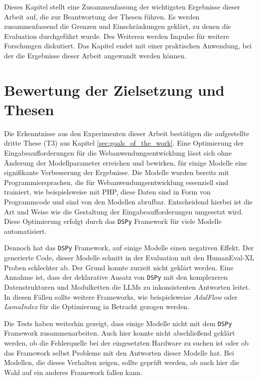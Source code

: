 Dieses Kapitel stellt eine Zusammenfassung der wichtigsten Ergebnisse dieser Arbeit auf, die zur Beantwortung der Thesen führen. Es werden zusammenfassend die Grenzen und Einschränkungen geklärt, zu denen die Evaluation durchgeführt wurde. Des Weiteren werden Impulse für weitere Forschungen diskutiert. Das Kapitel endet mit einer praktischen Anwendung, bei der die Ergebnisse dieser Arbeit angewandt werden können.


\section{Bewertung der Zielsetzung und Thesen}
Die Erkenntnisse aus den Experimenten dieser Arbeit bestätigen die aufgestellte dritte These (T3) aus Kapitel \ref{sec:goals_of_the_work}. Eine Optimierung der Eingabeaufforderungen für die Webanwendungsentwicklung lässt sich ohne Änderung der Modellparameter erreichen und bewirken, für einige Modelle eine signifikante Verbesserung der Ergebnisse. Die Modelle wurden bereits mit Programmiersprachen, die für Webanwendungsentwicklung essenziell sind trainiert, wie beispielsweise mit PHP, diese Daten sind in Form von Programmcode und sind von den Modellen abrufbar. Entscheidend hierbei ist die Art und Weise wie die Gestaltung der Eingabeaufforderungen umgesetzt wird. Diese Optimierung erfolgt durch das \texttt{DSPy} Framework für viele Modelle automatisiert.\vspace{0.2cm}

Dennoch hat das \texttt{DSPy} Framework, auf einige Modelle einen negativen Effekt. Der generierte Code, dieser Modelle schnitt in der Evaluation mit den HumanEval-XL Proben schlechter ab. Der Grund konnte zurzeit nicht geklärt werden. Eine Annahme ist, dass der deklarative Ansatz von \texttt{DSPy} mit den komplexeren Datenstrukturen und Modulketten die LLMs zu inkonsistenten Antworten leitet. In diesen Fällen sollte weitere Frameworks, wie beispielsweise \textit{AdalFlow} oder \textit{LamaIndex} für die Optimierung in Betracht gezogen werden.\vspace{0.2cm}

Die Tests haben weiterhin gezeigt, dass einige Modelle nicht mit dem \texttt{DSPy} Framework zusammenarbeiten. Auch hier konnte nicht abschließend geklärt werden, ob die Fehlerquelle bei der eingesetzten Hardware zu suchen ist oder ob das Framework selbst Probleme mit den Antworten dieser Modelle hat. Bei Modellen, die dieses Verhalten zeigen, sollte geprüft werden, ob auch hier die Wahl auf ein anderes Framework fallen kann.\vspace{0.2cm}

